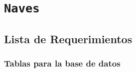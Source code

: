 \section{\texttt{Naves}}



\subsection{Lista de Requerimientos}

\subsubsection*{Tablas para la base de datos}

